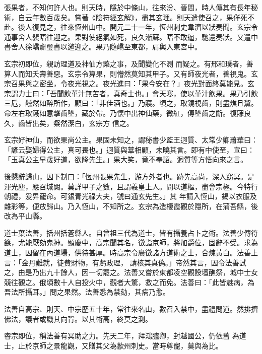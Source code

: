 \begin{pinyinscope}
 張果者，不知何許人也。則天時，隱於中條山，往來汾、晉間，時人傳其有長年秘術，自云年數百歲矣。嘗著《陰符經玄解》，盡其玄理。則天遣使召之，果佯死不赴。後人復見之，往來恆州山中。開元二十一年，恆州刺史韋濟以狀奏聞。玄宗令通事舍人裴晤往迎之。果對使絕氣如死，良久漸蘇。晤不敢逼，馳還奏狀。又遣中書舍人徐嶠齎璽書以邀迎之。果乃隨嶠至東都，肩輿入東宮中。



 玄宗初即位，親訪理道及神仙方藥之事，及聞變化不測
 而疑之。有邢和璞者，善算人而知夭壽善惡。玄宗令算果，則懵然莫知其甲子。又有師夜光者，善視鬼。玄宗召果與之密坐，令夜光視之。夜光進曰：「果今安在？」夜光對面終莫能見。玄宗謂力士曰：「吾聞飲堇汁無苦者，真奇士也。」會天寒，使以堇汁飲果。果乃引飲三卮，醺然如醉所作，顧曰：「非佳酒也。」乃寢。頃之，取鏡視齒，則盡燋且黧。命左右取鐵如意擊齒墜，藏於帶。乃懷中出神仙藥，微紅，傅墜齒之齗。復寐良久，齒皆出矣，粲然潔白，玄宗方
 信之。



 玄宗好神仙，而欲果尚公主。果固未知之，謂秘書少監王迥質、太常少卿蕭華曰：「諺云娶婦得公主，真可畏也。」迥質與華相顧，未曉其言。即有中使至，宣曰：「玉真公主早歲好道，欲降先生。」果大笑，竟不奉詔。迥質等方悟向來之言。



 後懇辭歸山，因下制曰：「恆州張果先生，游方外者也。跡先高尚，深入窈冥。是渾光塵，應召城闕。莫詳甲子之數，且謂羲皇上人。問以道樞，盡會宗極。今特行朝禮，爰畀寵命。可銀青光祿大夫，號曰通玄先生。」其
 年請入恆山，錫以衣服及雜彩等，便放歸山。乃入恆山，不知所之。玄宗為造棲霞觀於隱所，在蒲吾縣，後改為平山縣。



 道士葉法善，括州括蒼縣人。自曾祖三代為道士，皆有攝養占卜之術。法善少傳符籙，尤能厭劾鬼神。顯慶中，高宗聞其名，徵詣京師，將加爵位，固辭不受。求為道士，因留在內道場，供待甚厚。時高宗令廣徵諸方道術之士，合煉黃白。法善上言：「金丹難就，徒費財物，有虧政理，
 請核其真偽。」帝然其言，因令法善試之，由是乃出九十餘人，因一切罷之。法善又嘗於東都凌空觀設壇醮祭，城中士女競往觀之。俄頃數十人自投火中，觀者大驚，救之而免。法善曰：「此皆魅病，為吾法所攝耳。」問之果然。法善悉為禁劾，其病乃愈。



 法善自高宗、則天、中宗歷五十年，常往來名山，數召入禁中，盡禮問道。然排擠佛法，議者或譏其向背。以其術高，終莫之測。



 睿宗即位，稱法善有冥助之力。先天二年，拜鴻臚卿，封越國公，仍依舊
 為道士，止於京師之景龍觀，又贈其父為歙州刺史。當時尊寵，莫與為比。




\end{pinyinscope}
